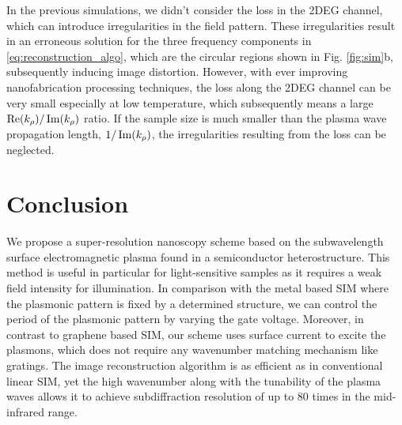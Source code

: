 \documentclass[12pt]{article}
\begin{document}
In the previous simulations, we didn't consider the loss in the 2DEG channel, which can introduce irregularities in the field pattern. These irregularities result in an erroneous solution for the three frequency components in \eqref{eq:reconstruction_algo}, which are the circular regions shown in Fig. \ref{fig:sim}b, subsequently inducing image distortion. However, with ever improving nanofabrication processing techniques, the loss along the 2DEG channel can be very small especially at low temperature, which subsequently means a large $\Re(k_{\rho})/\Im(k_{\rho})$ ratio. If the sample size is much smaller than the plasma wave propagation length, $1/\Im(k_{\rho})$, the irregularities resulting from the loss can be neglected.

\section{Conclusion}
%
We propose a super-resolution nanoscopy scheme based on the subwavelength surface electromagnetic plasma found in a semiconductor heterostructure. This method is useful in particular for light-sensitive samples as it requires a weak field intensity for illumination. In comparison with the metal based SIM where the plasmonic pattern is fixed by a determined structure, we can control the period of the plasmonic pattern by varying the gate voltage. Moreover, in contrast to graphene based SIM, our scheme uses surface current to excite the plasmons, which does not require any wavenumber matching mechanism like gratings. The image reconstruction algorithm is as efficient as in conventional linear SIM, yet the high wavenumber along with the tunability of the plasma waves allows it to achieve subdiffraction resolution of up to 80 times in the mid-infrared range.
\clearpage %
% 


\end{document}
